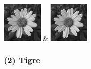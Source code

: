 \begin{table}[h!]
\begin{tabular}
        \includegraphics[width=2cm]{images/processed/flower/gaussian_5x5_sigma1.0/unblurred_15-iter.png} &
        \includegraphics[width=2cm]{images/processed/flower/gaussian_5x5_sigma2.0/unblurred_15-iter.png}                                                                                                                                                                                                 \\
    \end{tabular}
\end{table}

\newpage

\subsubsection*{(2) Tigre}


